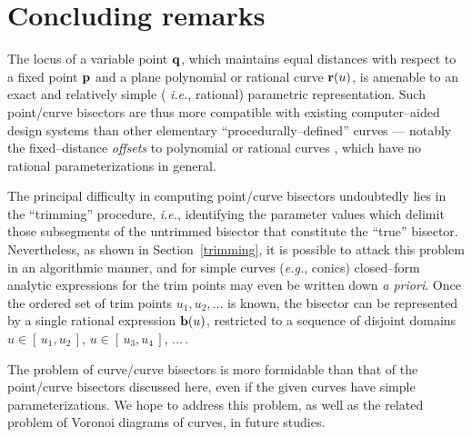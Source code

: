\section{Concluding remarks}
\label{conclusion}

The locus of a variable point ${\bf q}$, which maintains equal distances with
respect to a fixed point ${\bf p}$ and a plane polynomial or rational
curve ${\bf r}(u)$, is amenable to an exact and relatively simple ({\it
i.e.}, rational) parametric representation. Such point/curve bisectors
are thus more compatible with existing computer--aided design systems
than other elementary ``procedurally--defined'' curves --- notably the
fixed--distance {\it offsets\/} to polynomial or rational curves \cite
{farouki90a,farouki90b}, which have no rational parameterizations in
general.

The principal difficulty in computing point/curve bisectors undoubtedly
lies in the  ``trimming'' procedure, {\it i.e.}, identifying the parameter
values which delimit those subsegments of the untrimmed bisector 
that constitute the
``true'' bisector. Nevertheless, as shown in Section~\ref{trimming}, it is
possible to attack this problem in an algorithmic manner, and for simple
curves ({\it e.g.}, conics) closed--form analytic expressions for the
trim points may even be written down {\it a priori\/}.
Once the ordered set of trim points $u_1,u_2,\ldots$ is known, the
bisector can be represented by a single rational expression ${\bf b}(u)$,
restricted to a sequence of disjoint domains $u \in [\,u_1,u_2\,]$, $u
\in [\,u_3,u_4\,]$, $\ldots\,$.

The problem of curve/curve bisectors is more formidable than that
of the point/curve bisectors discussed here, even if the given curves
have simple parameterizations. We hope to address this problem, as well
as the related problem of Voronoi diagrams of curves, in future studies.

